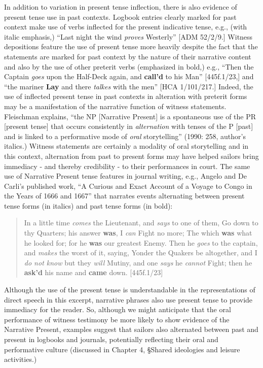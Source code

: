 \documentclass[12pt]{article}
\newenvironment{styleStandard}{\renewcommand\baselinestretch{1.0}\setlength\leftskip{0cm}\setlength\rightskip{0cm plus 1fil}\setlength\parindent{0cm}\setlength\parfillskip{0pt plus 1fil}\setlength\parskip{0in plus 1pt}\writerlistparindent\writerlistleftskip\leavevmode\normalfont\normalsize\writerlistlabel\ignorespaces}{\unskip\vspace{0in plus 1pt}\par}
\newcommand\writerlistleftskip{}
\newcommand\writerlistparindent{}
\newcommand\writerlistlabel{}
\begin{document}
\begin{styleStandard}
In addition to variation in present tense inflection, there is also evidence of present tense use in past contexts. Logbook entries clearly marked for past context make use of verbs inflected for the present indicative tense, e.g., (with italic emphasis,) “Last night the wind \textit{proves} Westerly” [ADM 52/2/9.] Witness depositions feature the use of present tense more heavily despite the fact that the statements are marked for past context by the nature of their narrative content and also by the use of other preterit verbs (emphasized in bold,) e.g., “Then the Captain \textit{goes} upon the Half-Deck again, and \textbf{call’d} to his Man” [445f.1/23,] and “the mariner \textbf{Lay} and there \textit{talkes} with the men” [HCA 1/101/217.] Indeed, the use of inflected present tense in past contexts in alteration with preterit forms may be a manifestation of the narrative function of witness statements. Fleischman explains, “the NP [Narrative Present] is a spontaneous use of the PR [present tense] that occurs consistently in \textit{alternation} with tenses of the P [past] and is linked to a performative mode of \textit{oral }storytelling” (1990: 258, author’s italics.) Witness statements are certainly a modality of oral storytelling and in this context, alternation from past to present forms may have helped sailors bring immediacy - and thereby credibility - to their performances in court. The same use of Narrative Present tense features in journal writing, e.g., Angelo and De Carli’s published work, “A Curious and Exact Account of a Voyage to Congo in the Years of 1666 and 1667” that narrates events alternating between present tense forms (in italics) and past tense forms (in bold):
\end{styleStandard}


\begin{quotation}
In a little time \textit{comes} the Lieutenant, and \textit{says} to one of them, Go down to thy Quarters; his answer \textbf{was}, I \textit{can} Fight no more; The which \textbf{was} what he looked for; for he \textbf{was} our greatest Enemy. Then he\textit{ goes} to the captain, and \textit{makes} the worst of it, saying, Yonder the Quakers be altogether, and I \textit{do not know} but they \textit{will }Mutiny, and one \textit{says} he \textit{cannot} Fight; then he \textbf{ask’d} his name and\textbf{ came} down. [445f.1/23]

\end{quotation}
\begin{styleStandard}
Although the use of the present tense is understandable in the representations of direct speech in this excerpt, narrative phrases also use present tense to provide immediacy for the reader. So, although we might anticipate that the oral performance of witness testimony be more likely to show evidence of the Narrative Present, examples suggest that sailors also alternated between past and present in logbooks and journals, potentially reflecting their oral and performative culture (discussed in Chapter 4, §Shared ideologies and leisure activities.) 
\end{styleStandard}
\end{document}
